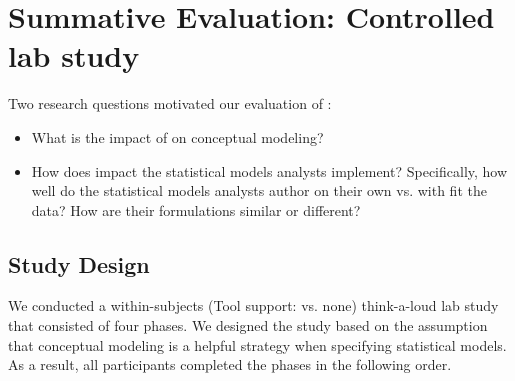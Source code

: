 \section{Summative Evaluation: Controlled lab study} \label{sec:summativeEval}

Two research questions motivated our evaluation of \rTisane:

\begin{itemize}
    \item \evalConceptualModels What is the impact of \rTisane on conceptual
    modeling?
    \item \evalStatisticalModels How does \rTisane impact the statistical models
    analysts implement? Specifically, how well do the statistical models
    analysts author on their own vs. with \rTisane fit the data? How are their
    formulations similar or different?
\end{itemize}

\subsection{Study Design}
We conducted a within-subjects (Tool support: \rTisane vs. none) think-a-loud
lab study that consisted of four phases. We designed the study based on the
assumption that conceptual modeling is a helpful strategy when specifying
statistical models. As a result, all participants completed the phases in the
following order.

